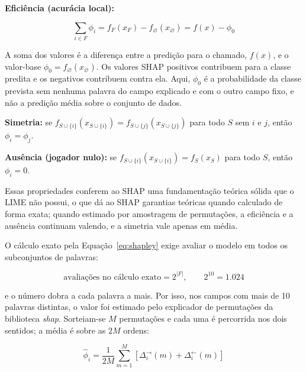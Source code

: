 \documentclass[
    12pt,                %
    openright,           %
    oneside,             %
    a4paper,             %
    english,             %
    brazil               %
]{abntex2}
\begin{document}
\textbf{Eficiência (acurácia local):}

\begin{equation}
\sum_{i \in F} \phi_i = f_F(x_F) - f_\varnothing(x_\varnothing) = f(x) - \phi_0
\label{eq:eficiencia}
\end{equation}

A soma dos valores é a diferença entre a predição para o chamado, $f(x)$, e o valor-base $\phi_0 = f_\varnothing(x_\varnothing)$. Os valores SHAP positivos contribuem para a classe predita e os negativos contribuem contra ela. Aqui, $\phi_0$ é a probabilidade da classe prevista sem nenhuma palavra do campo explicado e com o outro campo fixo, e não a predição média sobre o conjunto de dados.

\textbf{Simetria:} se $f_{S \cup \{i\}}(x_{S \cup \{i\}}) = f_{S \cup \{j\}}(x_{S \cup \{j\}})$ para todo $S$ sem $i$ e $j$, então $\phi_i = \phi_j$.

\textbf{Ausência (jogador nulo):} se $f_{S \cup \{i\}}(x_{S \cup \{i\}}) = f_S(x_S)$ para todo $S$, então $\phi_i = 0$.

Essas propriedades conferem ao SHAP uma fundamentação teórica sólida que o LIME não possui, o que dá ao SHAP garantias teóricas quando calculado de forma exata; quando estimado por amostragem de permutações, a eficiência e a ausência continuam valendo, e a simetria vale apenas em média.

\label{subsubsec:shap_kernel}

O cálculo exato pela Equação~\ref{eq:shapley} exige avaliar o modelo em todos os subconjuntos de palavras:

\begin{equation}
\text{avaliações no cálculo exato} = 2^{|F|}, \qquad 2^{10} = 1{.}024
\label{eq:custo-shap}
\end{equation}

e o número dobra a cada palavra a mais. Por isso, nos campos com mais de 10 palavras distintas, o valor foi estimado pelo explicador de permutações da biblioteca \textit{shap}. Sorteiam-se $M$ permutações e cada uma é percorrida nos dois sentidos; a média é sobre as $2M$ ordens: %

\begin{equation}
\hat{\phi}_i = \frac{1}{2M} \sum_{m=1}^{M}
\left[ \Delta_i^{\rightarrow}(m) + \Delta_i^{\leftarrow}(m) \right]
\label{eq:shap-amostragem}
\end{equation}
\end{document}

